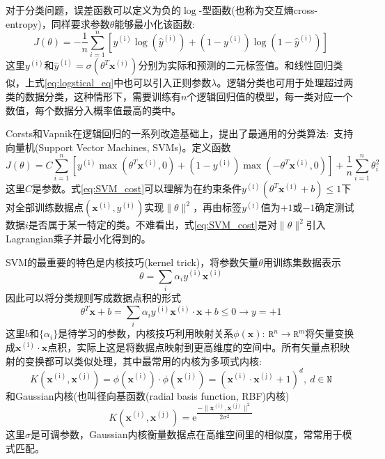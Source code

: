 对于分类问题，误差函数可以定义为负的$\log$-型函数(也称为交互熵\textrm{cross-entropy})，同样要求参数$\theta$能够最小化该函数:
\begin{equation}
	J(\theta) = -\dfrac1n\sum_{i=1}^n[y^{(\mathrm{i})}\log(\hat{y}^{(\mathrm{i})})+(1-y^{(\mathrm{i})})\log(1-\hat{y}^{(\mathrm{i})})]
	\label{eq:logstical_eq}
\end{equation}
这里$y^{(\mathrm{i})}$和$\hat{y}^{(\mathrm{i})}=\sigma(\theta^T\mathbf{x}^{(\mathrm{i})})$分别为实际和预测的二元标签值。和线性回归类似，上式\eqref{eq:logstical_eq}中也可以引入正则参数$\lambda$。逻辑分类也可用于处理超过两类的数据分类，这种情形下，需要训练有$n$个逻辑回归值的模型，每一类对应一个数值，每个数据分入概率值最高的类中。

\textrm{Corsts}和\textrm{Vapnik}在逻辑回归的一系列改造基础上，提出了最通用的分类算法:~支持向量机\textrm{(Support Vector Machines, SVMs)}\cite{ML20-273_1995}。定义函数
\begin{equation}
	J(\theta)=C\sum_{i=1}^n[y^{(\mathrm{i})}\max(\theta^T\mathbf{x}^{(\mathrm{i})},0)+(1-y^{(\mathrm{i})})\max(-\theta^T\mathbf{x}^{(\mathrm{i})},0)]+\dfrac1n\sum_{i=1}^n\theta_i^2
	\label{eq:SVM_cost}
\end{equation}
这里$C$是参数。式\eqref{eq:SVM_cost}可以理解为在约束条件$y^{(\mathrm{i})}(\theta^T\mathbf{x}^{(\mathrm{i})}+b)\leqslant1$下对全部训练数据点$(\mathbf{x}^{(\mathrm{i})},y^{(\mathrm{i})})$实现$\|\theta\|^2$，再由标签$y^{(\mathrm{i})}$值为$+1$或$-1$确定测试数据$i$是否属于某一特定的类。不难看出，式\eqref{eq:SVM_cost}是对$\|\theta\|^2$引入\textrm{Lagrangian}乘子并最小化得到的。

\textrm{SVM}的最重要的特色是内核技巧\textrm{(kernel trick)}，将参数矢量$\theta$用训练集数据表示
\begin{displaymath}
	\theta=\sum_i\alpha_iy^{(\mathrm{i})}\mathbf{x}^{(\mathrm{i})}
\end{displaymath}
因此可以将分类规则写成数据点积的形式
\begin{equation}
	\theta^T\mathbf{x}+b=\sum_i\alpha_iy^{(\mathrm{i})}\mathbf{x}^{(\mathrm{i})}\cdot\mathbf{x}+b\leqslant0\rightarrow y=+1
	\label{eq:SVM_cp}
\end{equation}
这里$b$和$\{\alpha_i\}$是待学习的参数，内核技巧利用映射关系$\phi(\mathbf{x}):~\mathtt{R}^n\rightarrow\mathtt{R}^m$将矢量变换成$\mathbf{x}^{(\mathrm{i})}\cdot\mathbf{x}$点积，实际上这是将数据点映射到更高维度的空间中。所有矢量点积映射的变换都可以类似处理，其中最常用的内核为多项式内核:
\begin{displaymath}
	K(\mathbf{x}^{(\mathrm{i})},\mathbf{x}^{(\mathrm{j})})=\phi(\mathbf{x}^{(\mathrm{i})})\cdot\phi(\mathbf{x}^{(\mathrm{j})})=(\mathbf{x}^{(\mathrm{i})}\cdot\mathbf{x}^{(\mathrm{j})}+1)^d,~d\in\mathtt{N}
\end{displaymath}
和\textrm{Gaussian}内核(也叫径向基函数(\textrm{radial basis function, RBF})内核)
\begin{displaymath}
	K(\mathbf{x}^{(\mathrm{i})},\mathbf{x}^{(\mathrm{j})})=\mathrm{e}^{\dfrac{-\|\mathbf{x}^{(\mathrm{i})},\mathbf{x}^{(\mathrm{j})}\|^2}{2\sigma^2}}
\end{displaymath}
这里$\sigma$是可调参数，\textrm{Gaussian}内核衡量数据点在高维空间里的相似度，常常用于模式匹配。

